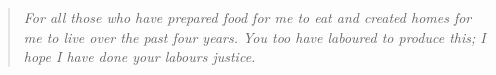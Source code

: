 
\begin{quotation}
\textit{For all those who have prepared food for me to eat and created homes for
  me to live over the past four years. You too have laboured to produce this; I
hope I have done your labours justice.}
\end{quotation}

